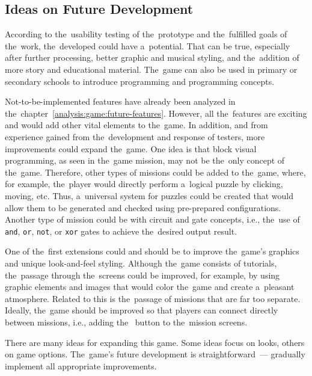 \begin{conclusion}
\section{Ideas on Future Development}

According to the~usability testing of the~prototype and the~fulfilled goals of the~work, the~developed could have a~potential.
That can be true, especially after further processing, better graphic and musical styling, and the~addition of more story and educational material.
The~game can also be used in primary or secondary schools to introduce programming and programming concepts.

Not-to-be-implemented features have already been analyzed in the~chapter~\ref{analysis:game:future-features}.
However, all the~features are exciting and would add other vital elements to the~game.
In addition, and from experience gained from the~development and response of testers, more improvements could expand the~game.
One idea is that block visual programming, as seen in the~game mission, may not be the~only concept of the~game.
Therefore, other types of missions could be added to the~game, where, for example, the~player would directly perform a~logical puzzle by clicking, moving, etc.
Thus, a~universal system for puzzles could be created that would allow them to be generated and checked using pre-prepared configurations.
Another type of mission could be with circuit and gate concepts, i.e., the~use of \texttt{and}, \texttt{or}, \texttt{not}, or \texttt{xor} gates to achieve the~desired output result.

One of the~first extensions could and should be to improve the~game's graphics and unique look-and-feel styling.
Although the~game consists of tutorials, the~passage through the~screens could be improved, for example, by using graphic elements and images that would color the~game and create a~pleasant atmosphere.
Related to this is the~passage of missions that are far too separate.
Ideally, the~game should be improved so that players can connect directly between missions, i.e., adding the~ button to the~mission screens.

There are many ideas for expanding this game.
Some ideas focus on looks, others on game options.
The~game's future development is straightforward~--- gradually implement all appropriate improvements.

\end{conclusion}
